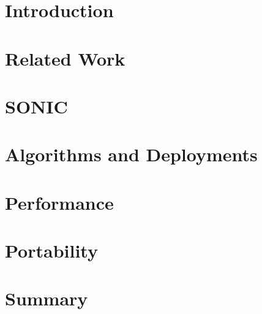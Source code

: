 \section{Introduction}
\label{sec:intro}


\section{Related Work}
\label{sec:pastwork}


\section{SONIC}
\label{sec:sonic}



\section{Algorithms and Deployments}
\label{sec:algo}



\section{Performance}
\label{sec:performances}


\section{Portability}
\label{sec:IPUs}


\section{Summary}
\label{sec:summary}



\clearpage
\begin{acknowledgments}
\end{acknowledgments}


